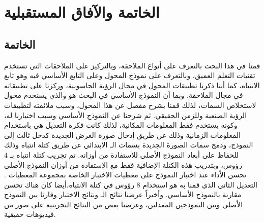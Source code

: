 \chapter{الخاتمة والآفاق المستقبلية}
\section{الخاتمة}
قمنا في هذا البحث بالتعرف على أنواع الملاحقة، وبالتركيز على الملاحقات التي تستخدم تقنيات التعلم العميق، وبالتعرف على نموذج المحول وعلى التابع الأساسي فيه وهو تابع الانتباه، كما أننا ذكرنا تطبيقات المحول في مجال الرؤية الحاسوبية، وركزنا على تطبيقاته في مجال الملاحقة.
وبما أن النموذج الأساسي في البحث هو 
والذي يستخدم محول 
لاستخلاص السمات، لذلك قمنا بشرح مفصل عن هذا المحول، وسبب ملائمته لتطبيقات الرؤية الصنعية وللزمن الحقيقي.
ثم شرحنا عن النموذج الأساسي
وسبب اختيارنا له، وكونه يستخدم فقط المعلومات المكانية، لذلك كانت فكرة التعديل هي باستخدام المعلومات الزمانية وذلك عن طريق إدخال صورة الغرض الجديدة 
كدخل ثالث إلى النموذج، ودمج سمات الصورة الجديدة بسمات الـ
الابتدائي عن طريق كتلة انتباه وذلك للحفاظ على أبعاد النموذج الأصلي للاستفادة من أوزانه.
تم تجريب كتلة انتباه بـ
$4$
رؤوس، وبتدريب هذه الكتلة الإضافية فقط مع الاستفادة من أوزان النموذج الأصلي تحسن الأداء عند اختبار النموذج على معطيات الاختبار الخاصة بمجموعة المعطيات
.
التعديل الثاني الذي قمنا به هو استخدام $8$ رؤوس في كتلة الانتباه،أيضا كان هناك تحسن مقارنة بالنموذج الأساسي.
وأخيراً عرضنا نتائج الـ
ونتائج الاختبار وقارنا بين النموذج الأصلي وبين النموذجين المعدلين، وعرضنا بعض من النتائج التجريبية على صور من فيديوهات حقيقية.
